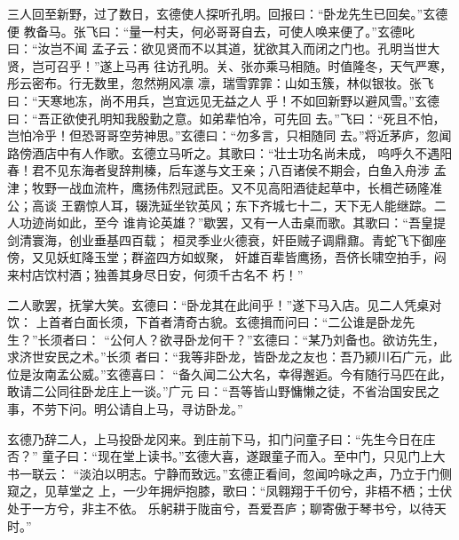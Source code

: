 三人回至新野，过了数日，玄德使人探听孔明。回报曰：“卧龙先生已回矣。”玄德便
教备马。张飞曰：“量一村夫，何必哥哥自去，可使人唤来便了。”玄德叱曰：“汝岂不闻
孟子云：欲见贤而不以其道，犹欲其入而闭之门也。孔明当世大贤，岂可召乎！”遂上马再
往访孔明。关、张亦乘马相随。时值隆冬，天气严寒，彤云密布。行无数里，忽然朔风凛
凛，瑞雪霏霏：山如玉簇，林似银妆。张飞曰：“天寒地冻，尚不用兵，岂宜远见无益之人
乎！不如回新野以避风雪。”玄德曰：“吾正欲使孔明知我殷勤之意。如弟辈怕冷，可先回
去。”飞曰：“死且不怕，岂怕冷乎！但恐哥哥空劳神思。”玄德曰：“勿多言，只相随同
去。”将近茅庐，忽闻路傍酒店中有人作歌。玄德立马听之。其歌曰：“壮士功名尚未成，
呜呼久不遇阳春！君不见东海者叟辞荆榛，后车遂与文王亲；八百诸侯不期会，白鱼入舟涉
孟津；牧野一战血流杵，鹰扬伟烈冠武臣。又不见高阳酒徒起草中，长楫芒砀隆准公；高谈
王霸惊人耳，辍洗延坐钦英风；东下齐城七十二，天下无人能继踪。二人功迹尚如此，至今
谁肯论英雄？”歇罢，又有一人击桌而歌。其歌曰：“吾皇提剑清寰海，创业垂基四百载；
桓灵季业火德衰，奸臣贼子调鼎鼐。青蛇飞下御座傍，又见妖虹降玉堂；群盗四方如蚁聚，
奸雄百辈皆鹰扬，吾侪长啸空拍手，闷来村店饮村酒；独善其身尽日安，何须千古名不
朽！”

二人歌罢，抚掌大笑。玄德曰：“卧龙其在此间乎！”遂下马入店。见二人凭桌对饮：
上首者白面长须，下首者清奇古貌。玄德揖而问曰：“二公谁是卧龙先生？”长须者曰：
“公何人？欲寻卧龙何干？”玄德曰：“某乃刘备也。欲访先生，求济世安民之术。”长须
者曰：“我等非卧龙，皆卧龙之友也：吾乃颍川石广元，此位是汝南孟公威。”玄德喜曰：
“备久闻二公大名，幸得邂逅。今有随行马匹在此，敢请二公同往卧龙庄上一谈。”广元
曰：“吾等皆山野慵懒之徒，不省治国安民之事，不劳下问。明公请自上马，寻访卧龙。”

玄德乃辞二人，上马投卧龙冈来。到庄前下马，扣门问童子曰：“先生今日在庄否？”
童子曰：“现在堂上读书。”玄德大喜，遂跟童子而入。至中门，只见门上大书一联云：
“淡泊以明志。宁静而致远。”玄德正看间，忽闻吟咏之声，乃立于门侧窥之，见草堂之
上，一少年拥炉抱膝，歌曰：“凤翱翔于千仞兮，非梧不栖；士伏处于一方兮，非主不依。
乐躬耕于陇亩兮，吾爱吾庐；聊寄傲于琴书兮，以待天时。”

